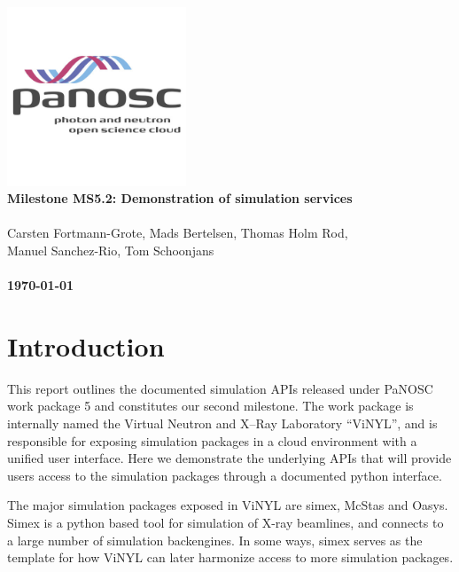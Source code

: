 \documentclass[10pt]{scrartcl}
\begin{document}
\makeatletter
\begin{titlepage}
\thispagestyle{scrheadings}
\ohead{}
\ihead{}
\chead{}
\ifoot{}
\ofoot{}
\noindent%
\includegraphics[width=0.4\textwidth]{figures/PaNOSClogo_web_RGB_512x512.jpg}\\
\Huge{%
\renewcommand{\baselinestretch}{2.0}%
  \textbf{%
    Milestone MS5.2: Demonstration of simulation services\\
  }%
}%
\\
{%
\Large{%
  Carsten Fortmann-Grote,
  Mads Bertelsen,
  Thomas Holm Rod,\\
  Manuel Sanchez-Rio,
  Tom Schoonjans
  \bigskip\\
  \bigskip\\
  \textbf{\today}%
}}%
\end{titlepage}
\makeatother

\section{Introduction}
% 

% 

This report outlines the documented simulation APIs released under PaNOSC work package 5 and constitutes our second milestone. The work package is internally named the Virtual Neutron and X--Ray Laboratory ``ViNYL'', and is responsible for exposing simulation packages in a cloud environment with a unified user interface. Here we demonstrate the underlying APIs that will provide users access to the simulation packages through a documented python interface.

The major simulation packages exposed in ViNYL are simex, McStas and Oasys. Simex is a python based tool for simulation of X-ray beamlines, and connects to a large number of simulation backengines. In some ways, simex serves as the template for how ViNYL can later harmonize access to more simulation packages.
\end{document}
